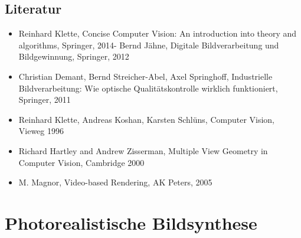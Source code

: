 \section*{Literatur\label{/mi-2017/modulbeschreibungen-master/MA_VC_Modul_BildbasierteComputergrafik}}\label{literaturpathlabelmi-2017modulbeschreibungen-mastermaux5fvcux5fmodulux5fbildbasiertecomputergrafik}

\begin{itemize}
\tightlist
\item
  Reinhard Klette, Concise Computer Vision: An introduction into theory
  and algorithms, Springer, 2014- Bernd Jähne, Digitale Bildverarbeitung
  und Bildgewinnung, Springer, 2012
\item
  Christian Demant, Bernd Streicher-Abel, Axel Springhoff, Industrielle
  Bildverarbeitung: Wie optische Qualitätskontrolle wirklich
  funktioniert, Springer, 2011
\item
  Reinhard Klette, Andreas Koshan, Karsten Schlüns, Computer Vision,
  Vieweg 1996
\item
  Richard Hartley and Andrew Zisserman, Multiple View Geometry in
  Computer Vision, Cambridge 2000
\item
  M. Magnor, Video-based Rendering, AK Peters, 2005
\end{itemize}

\chapter{Photorealistische
Bildsynthese\label{/mi-2017/modulbeschreibungen-master/MA_VC_Modul_PhotorealistischeBildsynthese}}\label{photorealistische-bildsynthesepathlabelmi-2017modulbeschreibungen-mastermaux5fvcux5fmodulux5fphotorealistischebildsynthese}

